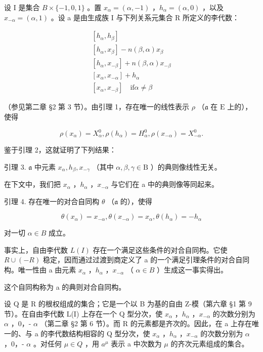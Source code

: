 设 I 是集合 \(B \times \{-1,0,1\}\) 。置 \(x_{\alpha} = (\alpha, -1)\) ，\(h_{\alpha} = (\alpha, 0)\) ，以及 \(x_{-\alpha} = (\alpha, 1)\) 。设 a 是由生成族 I 与下列关系元集合 R 所定义的李代数：

\[
\begin{array}{l} \left[ h _ {\alpha}, h _ {\beta} \right] \\ \left[ h _ {\alpha}, x _ {\beta} \right] - n (\beta , \alpha) x _ {\beta} \\ \left[ h _ {\alpha}, x _ {- \beta} \right] + n (\beta , \alpha) x _ {- \beta} \\ \left[ x _ {\alpha}, x _ {- \alpha} \right] + h _ {\alpha} \\ \left[ x _ {\alpha}, x _ {- \beta} \right] \quad \text {if} \alpha \neq \beta \end{array}
\]

（参见第二章 §2 第 3 节）。由引理 1，存在唯一的线性表示 \(\rho\) （\(\mathfrak{a}\) 在 \(\mathrm{E}\) 上的），使得

\[
\rho (x _ {\alpha}) = X _ {\alpha} ^ {0}, \rho (h _ {\alpha}) = H _ {\alpha} ^ {0}, \rho (x _ {- \alpha}) = X _ {- \alpha} ^ {0}.
\]

鉴于引理 2，这就证明了下列结果：

引理 3. \(\mathfrak{a}\) 中元素 \(x_{\alpha}, h_{\beta}, x_{-\gamma}\) （其中 \(\alpha, \beta, \gamma \in \mathrm{B}\) ）的典则像线性无关。

在下文中，我们把 \(x_{\alpha}\) ，\(h_{\alpha}\) ，\(x_{-\alpha}\) 与它们在 a 中的典则像等同起来。

引理 4. 存在唯一的对合自同构 \(\theta\) （\(\mathfrak{a}\) 的），使得

\[
\theta (x _ {\alpha}) = x _ {- \alpha}, \theta (x _ {- \alpha}) = x _ {\alpha}, \theta (h _ {\alpha}) = - h _ {\alpha}
\]

对一切 \(\alpha\in B\) 成立。

事实上，自由李代数 \(L(I)\) 存在一个满足这些条件的对合自同构。它使 \(R \cup (-R)\) 稳定，因而通过过渡到商定义了 a 的一个满足引理条件的对合自同构。唯一性由 a 由元素 \(x_{\alpha}\) ，\(h_{\alpha}\) ，\(x_{-\alpha}\) （ \(\alpha \in B\) ）生成这一事实得出。

这个自同构称为 a 的典则对合自同构。

设 Q 是 R 的根权组成的集合；它是一个以 B 为基的自由 Z-模（第六章 §1 第 9 节）。在自由李代数 L(I) 上存在一个 Q 型分次，使 \(x_{\alpha}\) ，\(h_{\alpha}\) ，\(x_{-\alpha}\) 的次数分别为 \(\alpha\) ，0，- \(\alpha\) （第二章 §2 第 6 节）。而 R 的元素都是齐次的。因此，在 a 上存在唯一的、与 a 的李代数结构相容的 Q 型分次，使 \(x_{\alpha}\) ，\(h_{\alpha}\) ，\(x_{-\alpha}\) 的次数分别为 \(\alpha\) ，0，- \(\alpha\) 。对任何 \(\mu \in Q\) ，用 \(a^{\mu}\) 表示 a 中次数为 \(\mu\) 的齐次元素组成的集合。

